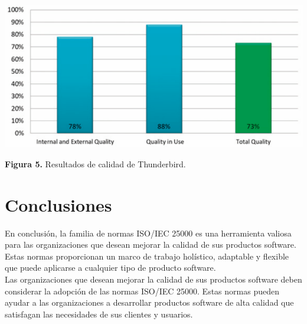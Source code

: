 \documentclass[https://www.overleaf.com/project/63761df255a8a9f4a15c3579
	letterpaper, %
	10pt, %
]{CSUniSchoolLabReport}
\begin{document}
                \begin{center}
                    \includegraphics[width=1\linewidth]{image5.png}
                \end{center}
                \begin{center}
                    \textbf{Figura 5.}\hspace{0.5em} Resultados de calidad de Thunderbird.
                \end{center}

    
    
    \section{Conclusiones}
    
    En conclusión, la familia de normas ISO/IEC 25000 es una herramienta valiosa para las organizaciones que desean mejorar la calidad de sus productos software. Estas normas proporcionan un marco de trabajo holístico, adaptable y flexible que puede aplicarse a cualquier tipo de producto software. 
    \\
    Las organizaciones que desean mejorar la calidad de sus productos software deben considerar la adopción de las normas ISO/IEC 25000. Estas normas pueden ayudar a las organizaciones a desarrollar productos software de alta calidad que satisfagan las necesidades de sus clientes y usuarios.
    
    
\end{document}
